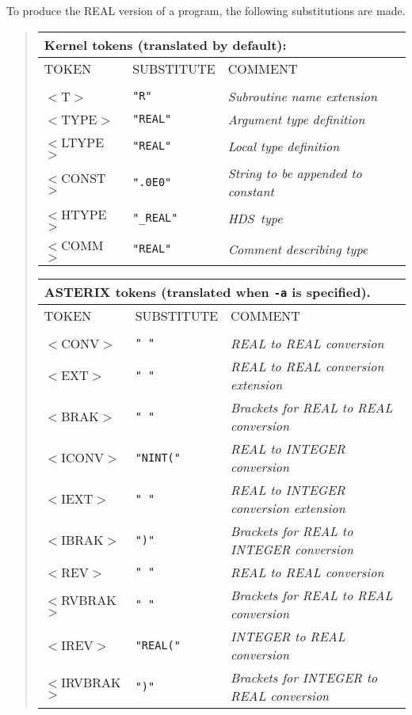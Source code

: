 \documentclass[twoside,11pt,nolof]{starlink}
\providecommand{\HDS}{{\footnotesize HDS}\normalsize}
\begin{document}
To produce the REAL version of a program, the following substitutions
are made.
\begin{quote}
\begin{tabular}{lll}
\multicolumn{3}{l}{\bf{Kernel} tokens (translated by default):}\\
\hline
TOKEN      &SUBSTITUTE      &COMMENT\\
\\
$<$T$>$     &\texttt{"R"}     &\emph{Subroutine name extension}\\
$<$TYPE$>$  &\texttt{"REAL"}  &\emph{Argument type definition}\\
$<$LTYPE$>$ &\texttt{"REAL"}  &\emph{Local type definition}\\
$<$CONST$>$ &\texttt{".0E0"}  &\emph{String to be appended to constant}\\
$<$HTYPE$>$ &\texttt{"\_REAL"} &\emph{\HDS\ type}\\
$<$COMM$>$  &\texttt{"REAL"}  &\emph{Comment describing type}\\
\end{tabular}

\begin{tabular}{lll}
\multicolumn{3}{l}{\bf{ASTERIX} tokens (translated when \texttt{-a} is specified).}\\
\hline
TOKEN      &SUBSTITUTE      &COMMENT\\
\\
$<$CONV$>$     &\texttt{" "}     &\emph{REAL to REAL conversion}\\
$<$EXT$>$      &\texttt{" "}     &\emph{REAL to REAL conversion extension}\\
$<$BRAK$>$     &\texttt{" "}  &\emph{Brackets for REAL to REAL conversion}\\
$<$ICONV$>$    &\texttt{"NINT("} &\emph{REAL to INTEGER conversion}\\
$<$IEXT$>$     &\texttt{" "}  &\emph{REAL to INTEGER conversion extension}\\
$<$IBRAK$>$    &\texttt{")"} &\emph{Brackets for REAL to INTEGER conversion}\\
$<$REV$>$      &\texttt{" "}     &\emph{REAL to REAL conversion}\\
$<$RVBRAK$>$   &\texttt{" "}   &\emph{Brackets for REAL to REAL conversion}\\
$<$IREV$>$     &\texttt{"REAL("} &\emph{INTEGER to REAL conversion}\\
$<$IRVBRAK$>$  &\texttt{")"} &\emph{Brackets for INTEGER to REAL conversion}\\
\end{tabular}
\end{quote}
\end{document}
